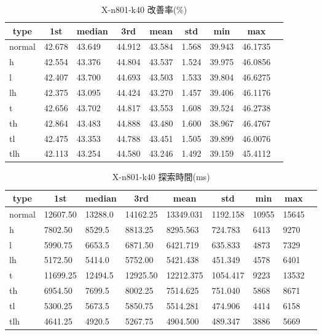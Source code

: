 \begin{table}[htbp]
    \caption{X-n801-k40 改善率(\%)}
    \begin{tabular}{|l|l|l|l|l|l|l|l|l|}\hline
    \multicolumn{1}{|c|}{\textbf{type}}
    &\multicolumn{1}{|c|}{\textbf{1st}}
    &\multicolumn{1}{c|}{\textbf{median}}
    &\multicolumn{1}{c|}{\textbf{3rd}}
    &\multicolumn{1}{c|}{\textbf{mean}}
    &\multicolumn{1}{c|}{\textbf{std}}
    &\multicolumn{1}{c|}{\textbf{min}}
    &\multicolumn{1}{c|}{\textbf{max}}\\\hline
	normal & 42.678 & 43.649 & 44.912 & 43.584 & 1.568 & 39.943 & 46.1735\\\hline
	h & 42.554 & 43.376 & 44.804 & 43.537 & 1.524 & 39.975 & 46.0856\\\hline
	l & 42.407 & 43.700 & 44.693 & 43.503 & 1.533 & 39.804 & 46.6275\\\hline
	lh & 42.375 & 43.095 & 44.424 & 43.270 & 1.457 & 39.406 & 46.1176\\\hline
	t & 42.656 & 43.702 & 44.817 & 43.553 & 1.608 & 39.524 & 46.2738\\\hline
	th & 42.864 & 43.483 & 44.888 & 43.480 & 1.600 & 38.967 & 46.4767\\\hline
	tl & 42.475 & 43.353 & 44.788 & 43.451 & 1.505 & 39.899 & 46.0076\\\hline
	tlh & 42.113 & 43.254 & 44.580 & 43.246 & 1.492 & 39.159 & 45.4112\\\hline
	\end{tabular}
\end{table}
\begin{table}[htbp]
    \caption{X-n801-k40 探索時間(ms)}
    \begin{tabular}{|l|l|l|l|l|l|l|l|l|}\hline
    \multicolumn{1}{|c|}{\textbf{type}}
    &\multicolumn{1}{|c|}{\textbf{1st}}
    &\multicolumn{1}{c|}{\textbf{median}}
    &\multicolumn{1}{c|}{\textbf{3rd}}
    &\multicolumn{1}{c|}{\textbf{mean}}
    &\multicolumn{1}{c|}{\textbf{std}}
    &\multicolumn{1}{c|}{\textbf{min}}
    &\multicolumn{1}{c|}{\textbf{max}}\\\hline
	normal & 12607.50 & 13288.0 & 14162.25 & 13349.031 & 1192.158 & 10955 & 15645\\\hline
	h & 7802.50 & 8529.5 & 8813.25 & 8295.563 & 724.783 & 6413 & 9270\\\hline
	l & 5990.75 & 6653.5 & 6871.50 & 6421.719 & 635.833 & 4873 & 7329\\\hline
	lh & 5172.50 & 5414.0 & 5752.00 & 5421.438 & 451.349 & 4578 & 6401\\\hline
	t & 11699.25 & 12494.5 & 12925.50 & 12212.375 & 1054.417 & 9223 & 13532\\\hline
	th & 6954.50 & 7699.5 & 8002.25 & 7514.625 & 751.040 & 5868 & 8671\\\hline
	tl & 5300.25 & 5673.5 & 5850.75 & 5514.281 & 474.906 & 4414 & 6158\\\hline
	tlh & 4641.25 & 4920.5 & 5267.75 & 4904.500 & 489.347 & 3886 & 5669\\\hline
	\end{tabular}
\end{table}
